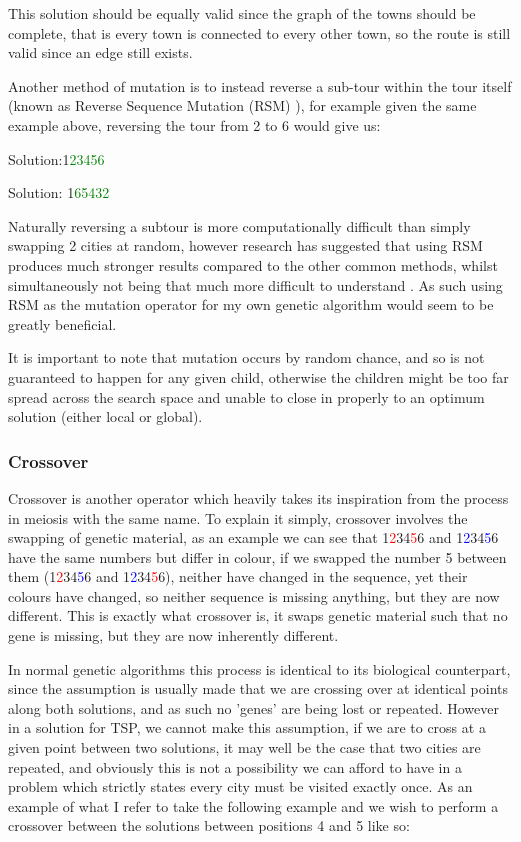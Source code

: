 \documentclass[11pt,a4paper,titlepage]{article}
\begin{document}
This solution should be equally valid since the graph of the towns should be complete, that is every town is connected to every other town, so the route is still valid since an edge still exists.

Another method of mutation is to instead reverse a sub-tour within the tour itself (known as Reverse Sequence Mutation (RSM) \cite{GAMutations}), for example given the same example above, reversing the tour from 2 to 6 would give us:
 
\begin{center}\Large
Solution:1\textcolor{green}{23456}

Solution: 1\textcolor{green}{65432}
\end{center}

Naturally reversing a subtour is more computationally difficult than simply swapping 2 cities at random, however research has suggested that using RSM produces much stronger results compared to the other common methods, whilst simultaneously not being that much more difficult to understand \cite{GAMutations}. As such using RSM as the mutation operator for my own genetic algorithm would seem to be greatly beneficial.

It is important to note that mutation occurs by random chance, and so is not guaranteed to happen for any given child, otherwise the children might be too far spread across the search space and unable to close in properly to an optimum solution (either local or global).

\subsubsection{Crossover}

Crossover is another operator which heavily takes its inspiration from the process in meiosis with the same name. To explain it simply, crossover involves the swapping of genetic material, as an example we can see that 1\textcolor{red}{2}34\textcolor{red}{5}6 and 1\textcolor{blue}{2}34\textcolor{blue}{5}6 have the same numbers but differ in colour, if we swapped the number 5 between them (1\textcolor{red}{2}34\textcolor{blue}{5}6 and 1\textcolor{blue}{2}34\textcolor{red}{5}6), neither have changed in the sequence, yet their colours have changed, so neither sequence is missing anything, but they are now different. This is exactly what crossover is, it swaps genetic material such that no gene is missing, but they are now inherently different.

In normal genetic algorithms this process is identical to its biological counterpart, since the assumption is usually made that we are crossing over at identical points along both solutions, and as such no 'genes' are being lost or repeated. However in a solution for TSP, we cannot make this assumption, if we are to cross at a given point between two solutions, it may well be the case that two cities are repeated, and obviously this is not a possibility we can afford to have in a problem which strictly states every city must be visited exactly once. As an example of what I refer to take the following example and we wish to perform a crossover between the solutions between positions 4 and 5 like so:
\end{document}
